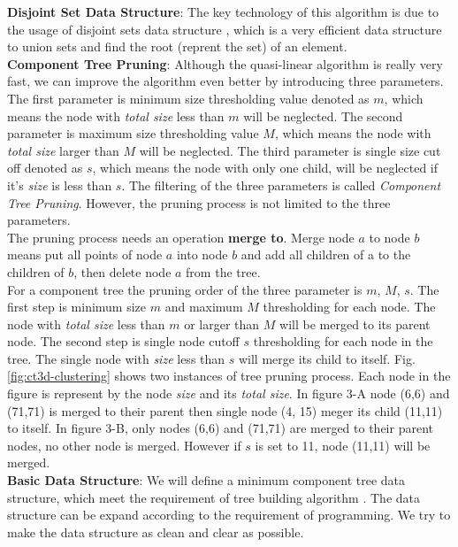 \textbf{Disjoint Set Data Structure}: The key technology of this algorithm is due to the usage of disjoint sets data structure \cite{disjointset2006impl} \cite{lect10disjointset}, which is a very efficient data structure to union sets and find the root (reprent the set) of an element.\\
\textbf{Component Tree Pruning}: Although the quasi-linear algorithm is really very fast, we can improve the algorithm even better  by introducing three parameters. The first parameter is minimum size thresholding value denoted as $m$, which means the node with \textit{total size} less than $m$ will be neglected. The second parameter is maximum size thresholding value $M$,  which means  the node with \textit{total size} larger than $M$ will be neglected. The third parameter is single size cut off denoted as $s$, which means the node with only one child, will be neglected if it's \textit{size} is less than $s$. The filtering of the three parameters is called \textit{Component Tree Pruning}. However, the pruning process is not limited to the three parameters. \\
The pruning process needs an operation \textbf{merge to}. Merge node $a$ to node $b$ means put all points of node $a$ into node $b$ and add all children of a to the children of $b$, then delete node $a$ from the tree. \\
For a component tree the pruning order of the three parameter is $m$, $M$, $s$. The first step is minimum size $m$ and maximum $M$ thresholding for each node. The node with \textit{total size} less than $m$ or larger than $M$ will be merged to its parent node. The second step is single node cutoff $s$ thresholding for each node in the tree. The single node with \textit{size} less than $s$ will merge its child to itself.  Fig. \ref{fig:ct3d-clustering} shows two instances of tree pruning process. Each node in the figure is represent by the node \textit{size} and its \textit{total size}. In figure 3-A node (6,6) and (71,71) is merged to their parent then single node (4, 15) meger its child (11,11) to itself. In figure 3-B, only nodes (6,6) and (71,71) are merged to their parent nodes, no other node is merged. However if $s$ is set to 11, node (11,11) will be merged.\\
\textbf{Basic Data Structure}: We will define a minimum component tree data structure, which meet the requirement of tree building algorithm \cite{najman2006building}. The data structure can be expand according to the requirement of programming. We try to make the data structure as clean and clear as possible.\\
